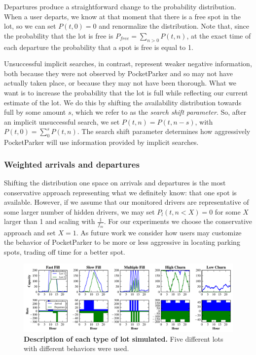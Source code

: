 \documentclass{sigchi}
\begin{document}
Departures produce a straightforward change to the probability distribution.
When a user departs, we know at that moment that there is a free spot in the
lot, so we can set $P(t, 0) = 0$ and renormalize the distribution. Note that,
since the probability that the lot is free is $P_{free} = \sum_{n > 0} P(t,
n)$, at the exact time of each departure the probability that a spot is free
is equal to 1. 

Unsuccessful implicit searches, in contrast, represent weaker negative
information, both because they were not observed by PocketParker and so may
not have actually taken place, or because they may not have been thorough.
What we want is to increase the probability that the lot is full while
reflecting our current estimate of the lot. We do this by shifting the
availability distribution towards full by some amount $s$, which we refer to
as the \textit{search shift parameter}. So, after an implicit unsuccessful
search, we set $P(t, n) = P(t, n - s)$, with $P(t, 0) = \sum_0^s P(t, n)$.
The search shift parameter determines how aggressively PocketParker will use
information provided by implicit searches.

\subsubsection{Weighted arrivals and departures}

Shifting the distribution one space on arrivals and departures is the most
conservative approach representing what we definitely know: that one spot is
available. However, if we assume that our monitored drivers are
representative of some larger number of hidden drivers, we may set $P_l(t, n
< X) = 0$ for some $X$ larger than 1 and scaling with $\frac{1}{f_m}$. For
our experiments we choose the conservative approach and set $X = 1$. As
future work we consider how users may customize the behavior of PocketParker
to be more or less aggressive in locating parking spots, trading off time for
a better spot.


\begin{figure}[t]
\centering
\includegraphics[width=\textwidth]{./simulator/figures/lots.pdf}

\caption{\textbf{Description of each type of lot simulated.} Five different
lots with different behaviors were used.}

\label{fig-lotsdescription}
\end{figure}
\end{document}
